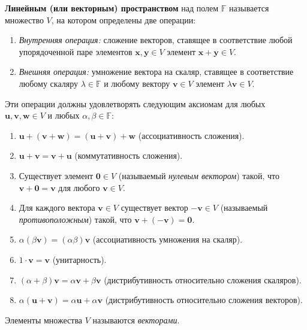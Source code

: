 \documentclass[10pt]{article}
\begin{document}
\begin{definition}
\textbf{Линейным (или векторным) пространством} над полем \(\mathbb{F}\) называется множество \(V\), на котором определены две операции:
\begin{enumerate}
    \item[\textbf{1.}] \textit{Внутренняя операция:} сложение векторов, ставящее в соответствие любой упорядоченной паре элементов \(\mathbf{x}, \mathbf{y} \in V\) элемент \(\mathbf{x} + \mathbf{y} \in V\).
    \item[\textbf{2.}] \textit{Внешняя операция:} умножение вектора на скаляр, ставящее в соответствие любому скаляру \(\lambda \in \mathbb{F}\) и любому вектору \(\mathbf{v} \in V\) элемент \(\lambda \mathbf{v} \in V\).
\end{enumerate}
Эти операции должны удовлетворять следующим аксиомам для любых \(\mathbf{u}, \mathbf{v}, \mathbf{w} \in V\) и любых \(\alpha, \beta \in \mathbb{F}\):

\begin{enumerate}
    \item \(\mathbf{u} + (\mathbf{v} + \mathbf{w}) = (\mathbf{u} + \mathbf{v}) + \mathbf{w}\) (ассоциативность сложения).
    \item \(\mathbf{u} + \mathbf{v} = \mathbf{v} + \mathbf{u}\) (коммутативность сложения).
    \item Существует элемент \(\mathbf{0} \in V\) (называемый \textit{нулевым вектором}) такой, что \(\mathbf{v} + \mathbf{0} = \mathbf{v}\) для любого \(\mathbf{v} \in V\).
    \item Для каждого вектора \(\mathbf{v} \in V\) существует вектор \(-\mathbf{v} \in V\) (называемый \textit{противоположным}) такой, что \(\mathbf{v} + (-\mathbf{v}) = \mathbf{0}\).
    \item \(\alpha(\beta\mathbf{v}) = (\alpha\beta)\mathbf{v}\) (ассоциативность умножения на скаляр).
    \item \(1 \cdot \mathbf{v} = \mathbf{v}\) (унитарность).
    \item \((\alpha + \beta)\mathbf{v} = \alpha\mathbf{v} + \beta\mathbf{v}\) (дистрибутивность относительно сложения скаляров).
    \item \(\alpha(\mathbf{u} + \mathbf{v}) = \alpha\mathbf{u} + \alpha\mathbf{v}\) (дистрибутивность относительно сложения векторов).
\end{enumerate}
Элементы множества \(V\) называются \textit{векторами}.
\end{definition}
\end{document}
